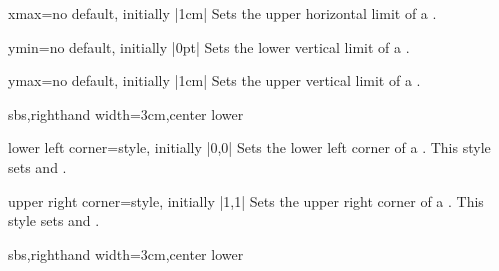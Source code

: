 \begin{vigTcbKey}[][doc new=2016-04-22]{xmax}{=}{no default, initially |1cm|}
  Sets the upper horizontal limit of a .
\end{vigTcbKey}

\begin{vigTcbKey}[][doc new=2016-04-22]{ymin}{=}{no default, initially |0pt|}
  Sets the lower vertical limit of a .
\end{vigTcbKey}

\begin{vigTcbKey}[][doc new=2016-04-22]{ymax}{=}{no default, initially |1cm|}
  Sets the upper vertical limit of a .
\end{vigTcbKey}


\begin{dispExample*}{sbs,righthand width=3cm,center lower}
\end{dispExample*}


\begin{vigTcbKey}[][doc new=2016-04-22]{lower left corner}{=}{style, initially |0,0|}
  Sets the lower left corner of a .
  This style sets  and .
\end{vigTcbKey}

\begin{vigTcbKey}[][doc new=2016-04-22]{upper right corner}{=}{style, initially |1,1|}
  Sets the upper right corner of a .
  This style sets  and .
\end{vigTcbKey}


\begin{dispExample*}{sbs,righthand width=3cm,center lower}
\end{dispExample*}

